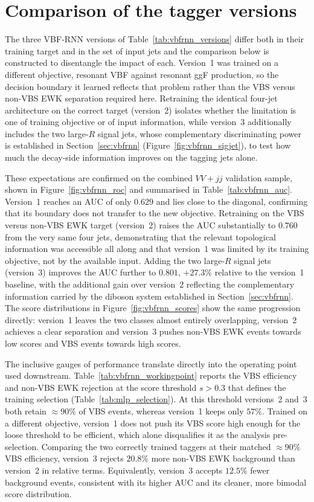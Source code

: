 \section{Comparison of the tagger versions}
\label{sec:vbfrnn_perf}

The three VBF-RNN versions of Table~\ref{tab:vbfrnn_versions} differ both in their training target and in the set of input jets and the comparison below is constructed to disentangle the impact of each. Version~1 was trained on a different objective, resonant VBF against resonant ggF production, so the decision boundary it learned reflects that problem rather than the VBS versus non-VBS EWK separation required here. Retraining the identical four-jet architecture on the correct target (version~2) isolates whether the limitation is one of training objective or of input information, while version~3 additionally includes the two large-$R$ signal jets, whose complementary discriminating power is established in Section~\ref{sec:vbfrnn} (Figure~\ref{fig:vbfrnn_sigjet}), to test how much the decay-side information improves on the tagging jets alone.

These expectations are confirmed on the combined $VV+jj$ validation sample, shown in Figure~\ref{fig:vbfrnn_roc} and summarised in Table~\ref{tab:vbfrnn_auc}. Version~1 reaches an AUC of only $0.629$ and lies close to the diagonal, confirming that its boundary does not transfer to the new objective. Retraining on the VBS versus non-VBS EWK target (version~2) raises the AUC substantially to $0.760$ from the very same four jets, demonstrating that the relevant topological information was accessible all along and that version~1 was limited by its training objective, not by the available input. Adding the two large-$R$ signal jets (version~3) improves the AUC further to $0.801$, $+27.3\%$ relative to the version~1 baseline, with the additional gain over version~2 reflecting the complementary information carried by the diboson system established in Section~\ref{sec:vbfrnn}. The score distributions in Figure~\ref{fig:vbfrnn_scores} show the same progression directly: version~1 leaves the two classes almost entirely overlapping, version~2 achieves a clear separation and version~3 pushes non-VBS EWK events towards low scores and VBS events towards high scores.

The inclusive gauges of performance translate directly into the operating point used downstream. Table~\ref{tab:vbfrnn_workingpoint} reports the VBS efficiency and non-VBS EWK rejection at the score threshold $s>0.3$ that defines the training selection (Table~\ref{tab:mlp_selection}). At this threshold versions~2 and~3 both retain $\approx\!90\%$ of VBS events, whereas version~1 keeps only $57\%$. Trained on a different objective, version~1 does not push its VBS score high enough for the loose threshold to be efficient, which alone disqualifies it as the analysis pre-selection. Comparing the two correctly trained taggers at their matched $\approx\!90\%$ VBS efficiency, version~3 rejects $20.8\%$ more non-VBS EWK background than version~2 in relative terms. Equivalently, version~3 accepts $12.5\%$ fewer background events, consistent with its higher AUC and its cleaner, more bimodal score distribution.

